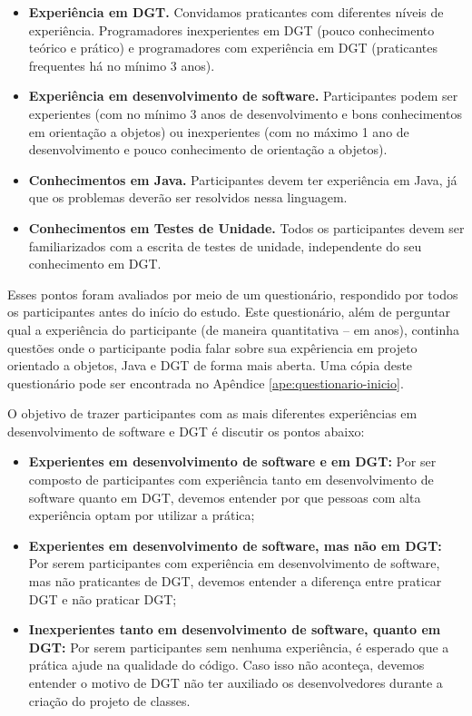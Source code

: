 \begin{itemize}
	\item \textbf{Experiência em DGT.} Convidamos praticantes com diferentes
	níveis de experiência. Programadores inexperientes em DGT (pouco conhecimento teórico e prático)
	e programadores com experiência em DGT (praticantes frequentes há no mínimo 3 anos).
	
	\item \textbf{Experiência em desenvolvimento de software.} Participantes podem ser
	experientes (com no mínimo 3 anos de desenvolvimento e bons conhecimentos em orientação a objetos) ou 
	inexperientes (com no máximo 1 ano de desenvolvimento e pouco conhecimento de orientação a objetos).

	\item \textbf{Conhecimentos em Java.} 
	Participantes devem ter experiência em Java, já que os problemas deverão ser resolvidos
	nessa linguagem.	
	
	\item \textbf{Conhecimentos em Testes de Unidade.} Todos os participantes devem ser
	familiarizados com a escrita de testes de unidade, independente do seu conhecimento
	em DGT.

\end{itemize}

Esses pontos foram avaliados por meio de um questionário, 
respondido por todos os participantes antes do início do estudo. 
Este questionário, além de perguntar qual a experiência
do participante (de maneira quantitativa -- em anos), 
continha questões onde o participante
podia falar sobre sua expêriencia em projeto orientado a objetos,
Java e DGT de forma mais aberta.
Uma cópia deste questionário
pode ser encontrada no Apêndice \ref{ape:questionario-inicio}.

O objetivo de trazer participantes com as mais diferentes experiências em desenvolvimento
de software e DGT é discutir os pontos abaixo:

\begin{itemize}
	\item \textbf{Experientes em desenvolvimento de software e em DGT:} 
	Por ser composto de participantes com experiência tanto
	em desenvolvimento de software quanto em DGT, devemos entender por que
	pessoas com alta experiência optam por utilizar a prática;
	
	\item \textbf{Experientes em desenvolvimento de software, mas não em DGT:} 
	Por serem participantes com experiência em desenvolvimento
	de software, mas não praticantes de DGT, devemos entender a diferença entre
	praticar DGT e não praticar DGT;
		
	\item \textbf{Inexperientes tanto em desenvolvimento de software, quanto em DGT:} 
	Por serem participantes sem nenhuma experiência, é esperado que
	a prática ajude na qualidade do código. Caso isso não aconteça, devemos
	entender o motivo de DGT não ter auxiliado os desenvolvedores durante a 
	criação do projeto de classes.
\end{itemize}

